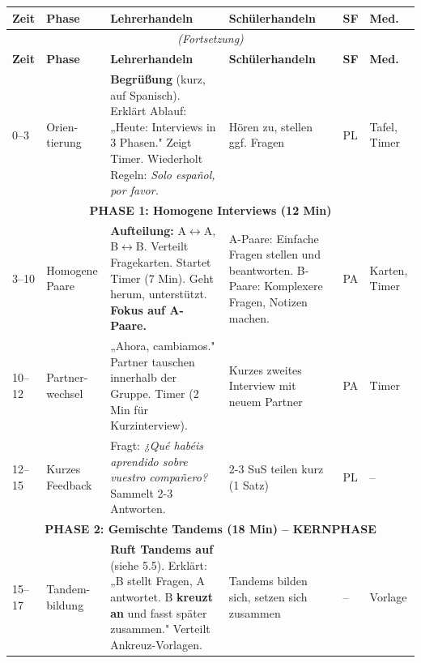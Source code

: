 \documentclass[11pt, a4paper]{article}
\newcommand{\es}[1]{\textcolor{spanisch}{\textit{#1}}}
\begin{document}
\begin{longtable}{|p{1.2cm}|p{2cm}|p{4cm}|p{3.5cm}|p{1.5cm}|p{1.5cm}|}
    \hline
    \textbf{Zeit} & \textbf{Phase} & \textbf{Lehrerhandeln} & \textbf{Schülerhandeln} & \textbf{SF} & \textbf{Med.} \\
    \hline
    \endfirsthead

    \multicolumn{6}{c}{\textit{(Fortsetzung)}} \\
    \hline
    \textbf{Zeit} & \textbf{Phase} & \textbf{Lehrerhandeln} & \textbf{Schülerhandeln} & \textbf{SF} & \textbf{Med.} \\
    \hline
    \endhead

    0--3 & Orien-tierung & \textbf{Begrüßung} (kurz, auf Spanisch). Erklärt Ablauf: „Heute: Interviews in 3 Phasen." Zeigt Timer. Wiederholt Regeln: \es{Solo español, por favor.} & Hören zu, stellen ggf. Fragen & PL & Tafel, Timer \\
    \hline

    \multicolumn{6}{|c|}{\cellcolor{hellgrau}\textbf{PHASE 1: Homogene Interviews (12 Min)}} \\
    \hline

    3--10 & Homogene Paare & \textbf{Aufteilung:} A$\leftrightarrow$A, B$\leftrightarrow$B. Verteilt Fragekarten. Startet Timer (7 Min). Geht herum, unterstützt. \textbf{Fokus auf A-Paare.} & A-Paare: Einfache Fragen stellen und beantworten. B-Paare: Komplexere Fragen, Notizen machen. & PA & Karten, Timer \\
    \hline

    10--12 & Partner-wechsel & „Ahora, cambiamos." Partner tauschen innerhalb der Gruppe. Timer (2 Min für Kurzinterview). & Kurzes zweites Interview mit neuem Partner & PA & Timer \\
    \hline

    12--15 & Kurzes Feedback & Fragt: \es{¿Qué habéis aprendido sobre vuestro compañero?} Sammelt 2-3 Antworten. & 2-3 SuS teilen kurz (1 Satz) & PL & -- \\
    \hline

    \multicolumn{6}{|c|}{\cellcolor{hellgrau}\textbf{PHASE 2: Gemischte Tandems (18 Min) -- KERNPHASE}} \\
    \hline

    15--17 & Tandem-bildung & \textbf{Ruft Tandems auf} (siehe 5.5). Erklärt: „B stellt Fragen, A antwortet. B \textbf{kreuzt an} und fasst später zusammen." Verteilt Ankreuz-Vorlagen. & Tandems bilden sich, setzen sich zusammen & -- & Vorlage \\
    \hline


\end{longtable}
\end{document}
